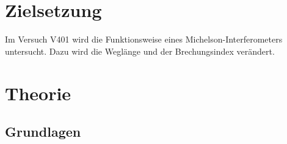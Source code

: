 \section{Zielsetzung}
\label{sec:Zielsetzung}

Im Versuch V401 wird die Funktionsweise eines Michelson-Interferometers untersucht. 
Dazu wird die Weglänge und der Brechungsindex verändert.

\section{Theorie}
\label{sec:Theorie}

\subsection{Grundlagen}
\label{sec:Grundlagen}



